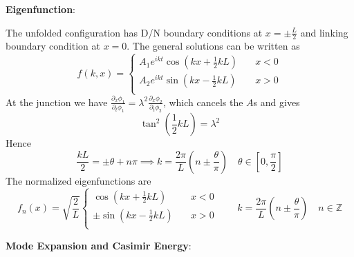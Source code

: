 \documentclass{article}
\begin{document}
{\bf Eigenfunction}: 

The unfolded configuration has D/N boundary conditions at $x = \pm \frac{L}{2}$ and linking boundary condition at $x = 0$. The general solutions can be written as
\begin{equation}
f(k, x) = 
\left\lbrace
\begin{aligned}
  A_1 e^{i kt} \cos(kx +\frac{1}{2}kL ) &  \quad x < 0  \\
  A_2 e^{ikt}  \sin(kx - \frac{1}{2}kL ) & \quad x > 0   \\
\end{aligned} \right. 
\end{equation}
At the junction we have $\frac{\partial_x \phi_1}{ \partial_t \phi_1} = \lambda^2 \frac{\partial_x \phi_2}{ \partial_t \phi_2}$, which cancels the $A$s and gives
\begin{equation}
\tan ^2 (\frac{1}{2} kL ) = \lambda^2 
\end{equation}
Hence
\begin{equation}
 \frac{kL}{2} = \pm \theta + n \pi \implies  k = \frac{2\pi}{L}( n \pm \frac{\theta}{\pi} )  \quad \theta \in [0,\frac{\pi}{2} ]  
\end{equation}
The normalized eigenfunctions are
\begin{equation}
f_n(x) = \sqrt{\frac{2}{L}}
\left\lbrace
\begin{aligned}
  \cos(kx +\frac{1}{2}kL ) &  \quad x < 0  \\
  \pm \sin(kx - \frac{1}{2}kL ) & \quad x > 0   \\
\end{aligned} \right. 
\qquad 
k = \frac{2\pi}{L}( n \pm  \frac{\theta}{\pi} )  \quad n \in \mathbb{Z} 
\end{equation}

{\bf Mode Expansion and Casimir Energy}:
\end{document}
